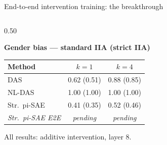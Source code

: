 \documentclass[aspectratio=169,11pt]{beamer}
\begin{document}
\begin{frame}{End-to-end intervention training: the breakthrough}
\begin{columns}[T]
\begin{column}{0.50\textwidth}
\vspace{0.5em}
{\scriptsize\centering
\textbf{Gender bias --- standard IIA (strict IIA)}\\[0.3em]
\begin{tabular}{l|cc}
\toprule
\textbf{Method} & \textbf{$k = 1$} & \textbf{$k = 4$} \\
\midrule
DAS              & 0.62 (0.51) & 0.88 (0.85) \\
NL-DAS           & 1.00 (1.00) & 1.00 (1.00) \\
\midrule
Str.\ pi-SAE     & 0.41 (0.35) & 0.52 (0.46) \\
\textit{Str.\ pi-SAE E2E} & \textit{pending} & \textit{pending} \\
\bottomrule
\end{tabular}
}

\vspace{0.3em}
{\scriptsize All results: additive intervention, layer 8.}
\end{column}
\end{columns}
\end{frame}
\end{document}
